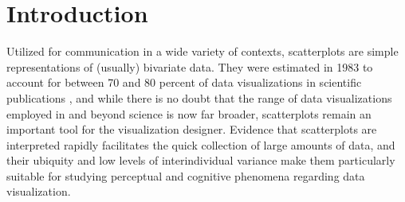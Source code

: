 \documentclass[manuscript,screen,review,anonymous]{acmart}
\begin{document}


\maketitle

\setlength{\parskip}{-0.1pt}

\section{Introduction}\label{sec-intro}

Utilized for communication in a wide variety of contexts, scatterplots
are simple representations of (usually) bivariate data. They were
estimated in 1983 to account for between 70 and 80 percent of data
visualizations in scientific publications \citep{tufte_1983}, and while
there is no doubt that the range of data visualizations employed in and
beyond science is now far broader, scatterplots remain an important tool
for the visualization designer. Evidence that scatterplots are
interpreted rapidly \citep{rensink_2014} facilitates the quick
collection of large amounts of data, and their ubiquity
\citep{tufte_1983} and low levels of interindividual variance
\citep{kay_2015} make them particularly suitable for studying perceptual
and cognitive phenomena regarding data visualization.
\end{document}
